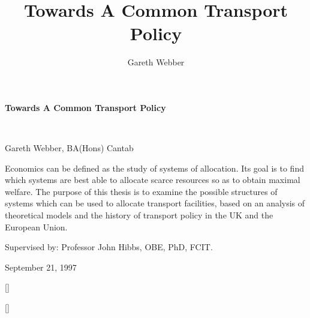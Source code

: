 \documentclass[11pt]{report}
\begin{document}
\begin{titlepage}
\pagecolor{titlepagecolor}\color{white}
{\noindent \titlefont \LARGE \bfseries Towards A Common Transport Policy}\title{Towards A Common Transport Policy}\\
\makebox[0pt][l]{\rule{1.3\textwidth}{2pt}}
\par {\noindent \titlefont \textcolor{namecolor}{Gareth Webber, BA(Hons) Cantab}}\author{Gareth Webber}
\vskip 3cm
{\noindent \titlefont  Economics can be defined as the study of systems of allocation. Its goal is to find which systems are best able to allocate scarce resources so as to obtain maximal welfare. The purpose of this thesis is to examine the possible structures of systems which can be used to allocate transport facilities, based on an analysis of theoretical models and the history of transport policy in the UK and the European Union.}
\par {\noindent  \textcolor{namecolor}{Supervised by: Professor John Hibbs, OBE, PhD, FCIT.}}
\par {\noindent  \textcolor{namecolor}{September 21, 1997}}
\end{titlepage}
\restoregeometry 
\pagecolor{white}

\titleformat{\chapter}[block]{\Huge\titlefont\bfseries}{\thechapter}{0ex}{\centering} []
\tableofcontents
\listoftables
\listoffigures

\titleformat{\chapter}[block]{\Huge\titlefont\bfseries}{\centering\thechapter\vskip -10pt}{0ex}{\centering\rule{0.3\textwidth}{2pt}\vskip 0pt\centering} []

	
		






\end{document}
